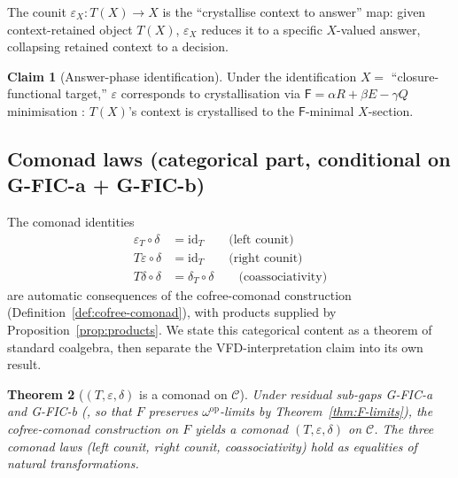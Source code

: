 \documentclass[11pt, a4paper]{amsart}
\newtheorem{theorem}{Theorem}[section]
\theoremstyle{definition}
\newtheorem{claim}[theorem]{Claim}
\newcommand{\catC}{\mathcal{C}}
\newcommand{\Fcrystal}{\mathsf{F}}
\begin{document}
The counit $\varepsilon_X \colon T(X) \to X$ is the ``crystallise
context to answer'' map: given context-retained object $T(X)$,
$\varepsilon_X$ reduces it to a specific $X$-valued answer,
collapsing retained context to a decision.

\begin{claim}[Answer-phase identification]
\label{claim:epsilon-crystallisation}
Under the identification $X = $ ``closure-functional target,''
$\varepsilon$ corresponds to crystallisation via
$\Fcrystal = \alpha R + \beta E - \gamma Q$ minimisation
\cite{VFDCrystallisation}: $T(X)$'s context is crystallised to
the $\Fcrystal$-minimal $X$-section.
\end{claim}

\subsection{Comonad laws (categorical part, conditional on G-FIC-a + G-FIC-b)}

The comonad identities
\begin{align*}
    \varepsilon_T \circ \delta &= \mathrm{id}_T
      \qquad \text{(left counit)} \\
    T \varepsilon \circ \delta &= \mathrm{id}_T
      \qquad \text{(right counit)} \\
    T \delta \circ \delta &= \delta_T \circ \delta
      \qquad \text{(coassociativity)}
\end{align*}
are automatic consequences of the cofree-comonad construction
(Definition~\ref{def:cofree-comonad}), with products supplied by
Proposition~\ref{prop:products}. We state this categorical
content as a theorem of standard coalgebra, then separate the
VFD-interpretation claim into its own result.

\begin{theorem}[$(T, \varepsilon, \delta)$ is a comonad on
  $\catC$]
\label{thm:comonad-laws}
Under residual sub-gaps G-FIC-a and G-FIC-b
(\cite{CascadeHFICClosure}, so that $F$ preserves
$\omega^{\mathrm{op}}$-limits by Theorem~\ref{thm:F-limits}),
the cofree-comonad construction on $F$ yields a comonad
$(T, \varepsilon, \delta)$ on $\catC$. The three comonad laws
(left counit, right counit, coassociativity) hold as
equalities of natural transformations.
\end{theorem}
\end{document}
